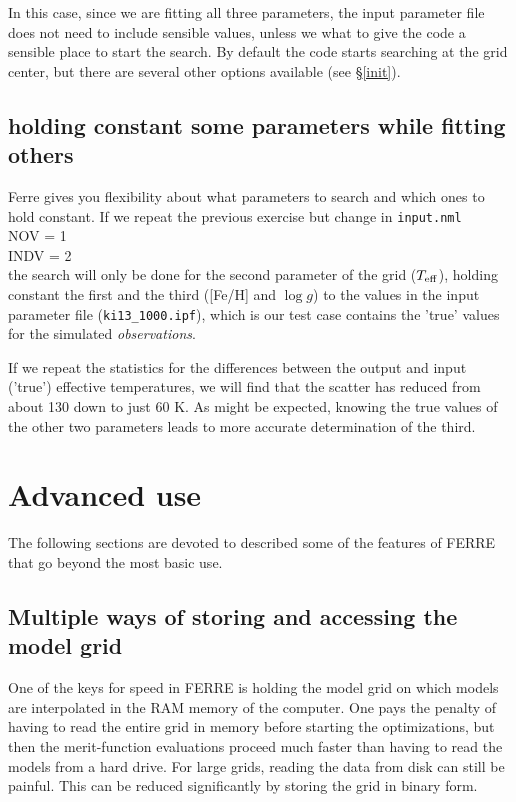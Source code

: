 \documentclass[12pt]{article}
\begin{document}
In this case, since we are fitting all three parameters, the input parameter file 
does not need to include sensible values, unless we what to give the code a 
sensible place to start the search. By default the code 
starts searching at the grid center, but there are several other options available
 (see \S \ref{init}).

\subsection{holding constant some parameters while fitting others}

Ferre gives you flexibility about what parameters to search and which ones 
to hold constant. If we repeat the previous exercise but change in {\tt input.nml} \\
NOV = 1 \\
INDV =  2 \\
the search will only be done for the second parameter of the grid ($T_{\rm eff}$), 
holding constant the first and the third ([Fe/H] and $\log g$) to the values 
in the input parameter file ({\tt ki13\_1000.ipf}), which is our test case 
contains the 'true' values for the simulated {\it observations}.

If we repeat the statistics for the differences between the output and input 
('true') effective temperatures, we will find that the scatter has reduced from 
about 130 down to just 60 K. As might be expected, knowing the true values of 
the other two parameters leads to more accurate determination of the third.

\section{Advanced use}

The following sections are devoted to described some of the features of FERRE 
that go beyond the most basic use. 

\subsection{Multiple ways of storing and accessing the model grid}

One of the keys for speed in FERRE is holding the model grid on which models
are interpolated in the RAM memory of the computer. One pays the penalty of 
having to read the entire grid in memory before starting the optimizations, 
but then the merit-function evaluations proceed much faster than having to
read the models from a hard drive. For large grids, reading the data from 
disk can still be painful. This can be reduced significantly by storing the
grid in binary form. 
\end{document}
